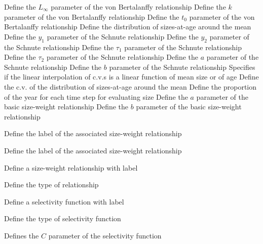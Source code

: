  {Define the $L_\infty$ parameter of the von Bertalanffy relationship}
 {Define the $k$ parameter of the von Bertalanffy relationship}
 {Define the $t_0$ parameter of the von Bertalanffy relationship}
 {Define the distribution of sizes-at-age around the mean}
 {Define the $y_1$ parameter of the Schnute relationship}
 {Define the $y_2$ parameter of the Schnute relationship}
 {Define the $\tau_1$ parameter of the Schnute relationship}
 {Define the $\tau_2$ parameter of the Schnute relationship}
 {Define the $a$ parameter of the Schnute relationship}
 {Define the $b$ parameter of the Schnute relationship}
 {Specifies if the linear interpolation of c.v.s is a linear function of mean size or of age}
 {Define the c.v. of the distribution of sizes-at-age around the mean}
 {Define the proportion of the year for each time step for evaluating size}
 {Define the $a$ parameter of the basic size-weight relationship}
 {Define the $b$ parameter of the basic size-weight relationship}
\par\textbf{}\par
{} {Define the label of the associated size-weight relationship}
\par\textbf{}\par
{} {Define the label of the associated size-weight relationship}
\par{} {Define a size-weight relationship with label}\par
{} {Define the type of relationship}
\par\textbf{}\par
\par\textbf{}\par
\par{} {Define a selectivity function with label}\par
{} {Define the type of selectivity function}
\par\textbf{}\par
{} {Defines the $C$ parameter of the selectivity function}
\par\textbf{}\par
